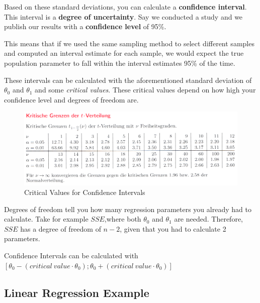 \documentclass[11pt]{article}
\begin{document}
\vspace{10px}

Based on these standard deviations, you can calculate a \textbf{confidence interval}. This interval is a \textbf{degree of uncertainty}. Say we conducted a study and we publish our results with a \textbf{confidence level} of 95\%.

This means that if we used the same sampling method to select different samples and computed an interval estimate for each sample, we would expect the true population parameter to fall within the interval estimates 95\% of the time.

\vspace{10px}

These intervals can be calculated with the aforementioned standard deviation of $\theta^{}_{0}$ and $\theta^{}_{1}$ and some \textit{critical values}. These critical values depend on how high your confidence level and degrees of freedom are.

\begin{figure}[htb!]
    \centering
    \includegraphics[keepaspectratio=true, width=\linewidth]{CriticalBordersTInterval.png}
    \caption{Critical Values for Confidence Intervals}
    \label{fig:critical_values}
\end{figure}


Degrees of freedom tell you how many regression parameters you already had to calculate. Take for example $SSE$,where both $\theta^{}_{0}$ and $\theta^{}_{1}$ are needed. Therefore, $SSE$ has a degree of freedom of $n-2$, given that you had to calculate 2 parameters.

\vspace{10px}

\noindent Confidence Intervals can be calculated with $[\theta_0 - (critical\ value \cdot \theta_0);\theta_0 + (critical\ value \cdot \theta_0)]$


\newpage

\subsection{Linear Regression Example}
\end{document}
